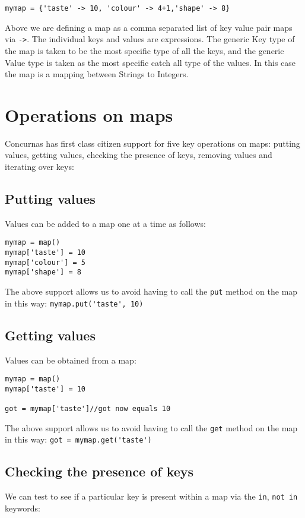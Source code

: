 \documentclass[conc-doc]{subfiles}
\begin{document}
\begin{lstlisting}
mymap = {'taste' -> 10, 'colour' -> 4+1,'shape' -> 8}
\end{lstlisting}

Above we are defining a map as a comma separated list of key value pair maps via \lstinline{->}. The individual keys and values are expressions. The generic Key type of the map is taken to be the most specific type of all the keys, and the generic Value type is taken as the most specific catch all type of the values. In this case the map is a mapping between Strings to Integers.

\section{Operations on maps}
Concurnas has first class citizen support for five key operations on maps: putting values, getting values, checking the presence of keys, removing values and iterating over keys:

\subsection{Putting values}
Values can be added to a map one at a time as follows:
\begin{lstlisting}
mymap = map()
mymap['taste'] = 10
mymap['colour'] = 5
mymap['shape'] = 8
\end{lstlisting}

The above support allows us to avoid having to call the \lstinline{put} method on the map in this way: \lstinline{mymap.put('taste', 10) }

\subsection{Getting values}
Values can be obtained from a map:
\begin{lstlisting}
mymap = map()
mymap['taste'] = 10

got = mymap['taste']//got now equals 10
\end{lstlisting}

The above support allows us to avoid having to call the \lstinline{get} method on the map in this way: \lstinline{got = mymap.get('taste')}

\subsection{Checking the presence of keys}
We can test to see if a particular key is present within a map via the \lstinline{in}, \lstinline{not in} keywords:
\end{document}
